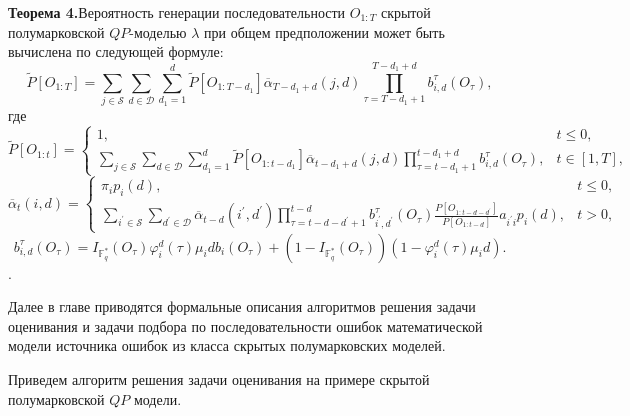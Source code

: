 \documentclass[twoside,12pt]{article}
\begin{document}
\textbf{Теорема 4.}Вероятность генерации последовательности $O_{1:T}$ скрытой полумарковской $QP$-моделью $\lambda$ при общем предположении может быть вычислена по следующей формуле:
\begin{equation}\nonumber
\widetilde{P}[O_{1:T}]=\sum\limits_{j\in \mathcal{S}}\sum\limits_{d \in \mathcal{D}}\sum\limits_{d_1=1}^{d}\widetilde{P}[O_{1:T-d_1}]\overline{\alpha}_{T-d_1+d}(j,d)\prod\limits_{\tau=T-d_1+1}^{T-d_1+d} b_{i,d}^\tau(O_\tau),
\end{equation}
где
\begin{equation}\nonumber
\widetilde{P}[O_{1:t}]=\left\{\begin{array}{ll}
1, &t\leq 0,\\\sum\limits_{j\in \mathcal{S}}\sum\limits_{d \in \mathcal{D}}\sum\limits_{d_1=1}^{d}\widetilde{P}[O_{1:t-d_1}]\overline{\alpha}_{t-d_1+d}(j,d)\prod\limits_{\tau=t-d_1+1}^{t-d_1+d} b_{i,d}^\tau(O_\tau),& t\in [1,T],\end{array}\right.
\end{equation}
\begin{equation}\nonumber
\overline{\alpha}_{t}(i,d)=\left\{
\begin{array}{ll}
\pi_i p_i(d), &t\leq 0,\\
\sum\limits_{i^\prime\in \mathcal{S}}\sum\limits_{d^\prime \in \mathcal{D}}\overline{\alpha}_{t-d}(i^\prime,d^\prime)
\prod\limits_{\tau=t-d-d^\prime+1}^{t-d}b_{i^\prime,d^\prime}^\tau(O_\tau)\frac{P[O_{1:t-d-d^\prime}]}{P[O_{1:t-d}]}
a_{i^\prime i} p_i(d), & t>0,
\end{array}\right.
\end{equation}
$$b_{i,d}^{\tau}(O_\tau) =I_{\mathbb{F}^{\ast}_q}(O_\tau)\varphi_i^d(\tau)\mu_idb_i(O_\tau)+(1-I_{\mathbb{F}^{\ast}_q}(O_\tau))(1-\varphi_i^d(\tau)\mu_id).$$.

Далее в главе приводятся формальные описания алгоритмов решения задачи оценивания и задачи подбора по последовательности ошибок математической модели источника ошибок из класса скрытых полумарковских моделей.

Приведем алгоритм решения задачи оценивания на примере скрытой полумарковской $QP$ модели.
\end{document}
